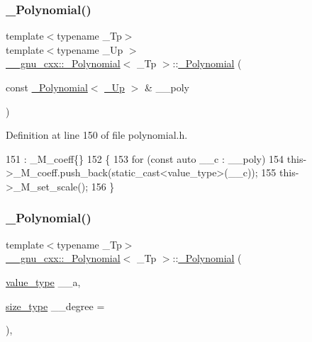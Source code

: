 \subsubsection{\texorpdfstring{\+\_\+\+Polynomial()}{\_Polynomial()}\hspace{0.1cm}{\footnotesize\ttfamily [4/9]}}
{\footnotesize\ttfamily template$<$typename \+\_\+\+Tp$>$ \\
template$<$typename \+\_\+\+Up $>$ \\
\hyperlink{class____gnu__cxx_1_1__Polynomial}{\+\_\+\+\_\+gnu\+\_\+cxx\+::\+\_\+\+Polynomial}$<$ \+\_\+\+Tp $>$\+::\hyperlink{class____gnu__cxx_1_1__Polynomial}{\+\_\+\+Polynomial} (\begin{DoxyParamCaption}\item[{const \hyperlink{class____gnu__cxx_1_1__Polynomial}{\+\_\+\+Polynomial}$<$ \hyperlink{class____gnu__cxx_1_1__Polynomial_a242114d4b86648a5dff67a8221f80d40}{\+\_\+\+Up} $>$ \&}]{\+\_\+\+\_\+poly }\end{DoxyParamCaption})\hspace{0.3cm}{\ttfamily [inline]}}



Definition at line 150 of file polynomial.\+h.


\begin{DoxyCode}
151         : \_M\_coeff\{\}
152         \{
153           \textcolor{keywordflow}{for} (\textcolor{keyword}{const} \textcolor{keyword}{auto} \_\_c : \_\_poly)
154             this->\_M\_coeff.push\_back(static\_cast<value\_type>(\_\_c));
155           this->\_M\_set\_scale();
156         \}
\end{DoxyCode}
\mbox{\label{class____gnu__cxx_1_1__Polynomial_ad89b416fedd4e3a23b484d5269767a93}} 
\subsubsection{\texorpdfstring{\+\_\+\+Polynomial()}{\_Polynomial()}\hspace{0.1cm}{\footnotesize\ttfamily [5/9]}}
{\footnotesize\ttfamily template$<$typename \+\_\+\+Tp$>$ \\
\hyperlink{class____gnu__cxx_1_1__Polynomial}{\+\_\+\+\_\+gnu\+\_\+cxx\+::\+\_\+\+Polynomial}$<$ \+\_\+\+Tp $>$\+::\hyperlink{class____gnu__cxx_1_1__Polynomial}{\+\_\+\+Polynomial} (\begin{DoxyParamCaption}\item[{\hyperlink{class____gnu__cxx_1_1__Polynomial_a725563351f50e76084a7a016c06f8a53}{value\+\_\+type}}]{\+\_\+\+\_\+a,  }\item[{\hyperlink{class____gnu__cxx_1_1__Polynomial_a6afe219c123c7a2fdc5abac8a6639053}{size\+\_\+type}}]{\+\_\+\+\_\+degree = {} }\end{DoxyParamCaption})\hspace{0.3cm}{\ttfamily [inline]}, {\ttfamily [explicit]}}

